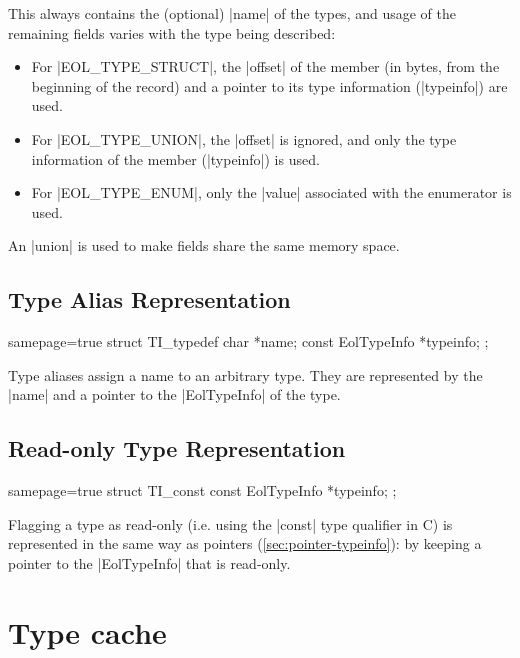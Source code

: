 \noindent
This always contains the (optional) \Mc|name| of the types, and usage of the
remaining fields varies with the type being described:

\begin{itemize}
  \item For \Mc|EOL_TYPE_STRUCT|, the \Mc|offset| of the member (in bytes,
    from the beginning of the record) and a pointer to its type information
    (\Mc|typeinfo|) are used.
  \item For \Mc|EOL_TYPE_UNION|, the \Mc|offset| is ignored, and only the
    type information of the member (\Mc|typeinfo|) is used.
  \item For \Mc|EOL_TYPE_ENUM|, only the \Mc|value| associated with the
    enumerator is used.
\end{itemize}

\noindent
An \Mc|union| is used to make fields share the same memory space.


\subsection{Type Alias Representation}

\begin{ccode*}{samepage=true}
  struct TI_typedef {
    char              *name;
    const EolTypeInfo *typeinfo;
  };
\end{ccode*}

Type aliases assign a name to an arbitrary type. They are represented by the
\Mc|name| and a pointer to the \Mc|EolTypeInfo| of the type.


\subsection{Read-only Type Representation}

\begin{ccode*}{samepage=true}
  struct TI_const {
    const EolTypeInfo *typeinfo;
  };
\end{ccode*}

\noindent
Flagging a type as read-only (i.e. using the \Mc|const| type qualifier in C)
is represented in the same way as pointers (\autoref{sec:pointer-typeinfo}):
by keeping a pointer to the \Mc|EolTypeInfo| that is read-only.




\section{Type cache}
  \label{sec:impl-type-cache}

